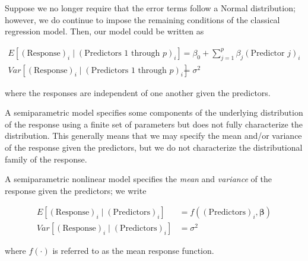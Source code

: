 \documentclass[
  letterpaper,
  DIV=11,
  numbers=noendperiod]{scrreprt}
\providecommand{\tightlist}{%
  \setlength{\itemsep}{0pt}\setlength{\parskip}{0pt}}\usepackage{longtable,booktabs,array}
\theoremstyle{definition}
\theoremstyle{definition}
\theoremstyle{remark}
\begin{document}
\begin{description}
\tightlist
\item[Semiparametric Linear Model
(Definition~\ref{def-semiparametric-linear-model})]
Suppose we no longer require that the error terms follow a Normal
distribution; however, we do continue to impose the remaining conditions
of the classical regression model. Then, our model could be written as
\end{description}

\[
\begin{aligned}
  E\left[(\text{Response})_i \mid (\text{Predictors 1 through } p)_i\right]
    &= \beta_0 + \sum\limits_{j=1}^{p} \beta_j (\text{Predictor } j)_i \\
  Var\left[(\text{Response})_i \mid (\text{Predictors 1 through } p)_i\right]
    &= \sigma^2
\end{aligned}
\]

where the responses are independent of one another given the predictors.

\begin{description}
\tightlist
\item[Semiparametric Model (Definition~\ref{def-semiparametric-model})]
A semiparametric model specifies some components of the underlying
distribution of the response using a finite set of parameters but does
not fully characterize the distribution. This generally means that we
may specify the mean and/or variance of the response given the
predictors, but we do not characterize the distributional family of the
response.
\item[Semiparametric Nonlinear Model
(Definition~\ref{def-semiparametric-nonlinear-model})]
A semiparametric nonlinear model specifies the \emph{mean} and
\emph{variance} of the response given the predictors; we write
\end{description}

\[
\begin{aligned}
  E\left[(\text{Response})_i \mid (\text{Predictors})_i\right] 
    &= f\left((\text{Predictors})_i, \boldsymbol{\beta}\right) \\
  Var\left[(\text{Response})_i \mid (\text{Predictors})_i\right]
    &= \sigma^2
\end{aligned}
\]

where \(f(\cdot)\) is referred to as the mean response function.
\end{document}
